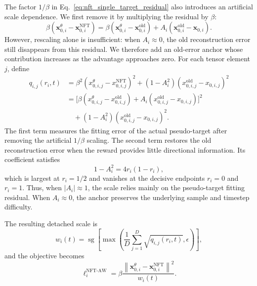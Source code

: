 \documentclass{article} %
\begin{document}
The factor \(1/\beta\) in
Eq.~\ref{eq:nft_single_target_residual} also introduces an artificial scale
dependence. We first remove it by multiplying the residual by \(\beta\):
\begin{equation}
\beta
\left(
\mathbf{x}_{0,i}^{\theta}
-
\mathbf{x}_{0,i}^{\mathrm{NFT}}
\right)
=
\beta
\left(
\mathbf{x}_{0,i}^{\theta}
-
\mathbf{x}_{0,i}^{\mathrm{old}}
\right)
+
A_i
\left(
\mathbf{x}_{0,i}^{\mathrm{old}}
-
\mathbf{x}_{0,i}
\right).
\end{equation}
However, rescaling alone is insufficient: when \(A_i\approx0\), the old
reconstruction error still disappears from this residual. We therefore add an
old-error anchor whose contribution increases as the advantage approaches
zero. For each tensor element \(j\), define
\begin{align}
q_{i,j}(r_i,t)
&=
\beta^2
\left(
x_{0,i,j}^{\theta}
-
x_{0,i,j}^{\mathrm{NFT}}
\right)^2
+
\left(1-A_i^2\right)
\left(
x_{0,i,j}^{\mathrm{old}}
-
x_{0,i,j}
\right)^2
\nonumber\\
&=
\Big[
\beta
\left(
x_{0,i,j}^{\theta}
-
x_{0,i,j}^{\mathrm{old}}
\right)
+
A_i
\left(
x_{0,i,j}^{\mathrm{old}}
-
x_{0,i,j}
\right)
\Big]^2
\nonumber\\
&\quad+
\left(1-A_i^2\right)
\left(
x_{0,i,j}^{\mathrm{old}}
-
x_{0,i,j}
\right)^2.
\label{eq:nft_branchfree_second_moment}
\end{align}
The first term measures the fitting error of the actual pseudo-target after
removing the artificial \(1/\beta\) scaling. The second term restores the old
reconstruction error when the reward provides little directional information.
Its coefficient satisfies
\begin{equation}
1-A_i^2
=
4r_i(1-r_i),
\end{equation}
which is largest at \(r_i=1/2\) and vanishes at the decisive endpoints
\(r_i=0\) and \(r_i=1\). Thus, when \(\lvert A_i\rvert\approx1\), the scale
relies mainly on the pseudo-target fitting residual. When \(A_i\approx0\), the
anchor preserves the underlying sample and timestep difficulty.

The resulting detached scale is
\begin{equation}
w_i(t)
=
\operatorname{sg}
\left[
\max
\left(
\frac{1}{D}
\sum_{j=1}^{D}
\sqrt{q_{i,j}(r_i,t)},
\epsilon
\right)
\right],
\label{eq:nft_branchfree_weight}
\end{equation}
and the objective becomes
\begin{equation}
\label{eq:nft_branchfree_adaptive}
\ell_i^{\mathrm{NFT\text{-}AW}}
=
\beta
\frac{
\left\|
\mathbf{x}_{0,i}^{\theta}
-
\mathbf{x}_{0,i}^{\mathrm{NFT}}
\right\|^2
}{
w_i(t)
}.
\end{equation}
\end{document}
